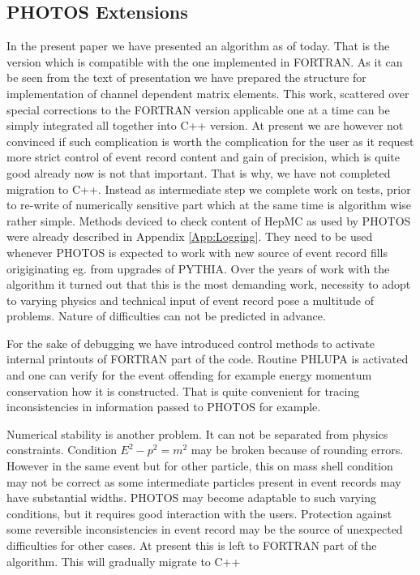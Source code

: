 \documentclass[]{Photos_interface_design}
\begin{document}
\subsection{PHOTOS Extensions}
In the present paper we have presented an algorithm as of today. 
That is the version which is compatible with the one implemented in FORTRAN.
As it can be seen from the text of presentation we have prepared the structure 
for implementation of channel dependent matrix elements. This work, scattered
 over special corrections to the FORTRAN version applicable one at a time can  
be simply integrated all together into C++ version.
 At present we are however not convinced if such complication is worth 
the complication for the user as it request more strict control of event 
record content and gain of precision, which is quite good already now is 
not that important. That is why, we have not completed migration to C++.
Instead as intermediate step we complete work on tests, prior to re-write
 of numerically sensitive part which at the same time is algorithm wise rather 
simple.
Methods deviced to check content of HepMC as used by PHOTOS were already 
described in Appendix \ref{App:Logging}. They need to be used whenever PHOTOS 
is expected to work with new source of event record fills origiginating eg. 
from upgrades of  PYTHIA. 
Over the years of work with the algorithm it turned out that this is the
most demanding work, 
necessity to adopt to varying physics and technical input of event record
pose a multitude of problems. Nature of difficulties can not be predicted 
in advance.


For the sake of debugging we have introduced control methods to activate
 internal printouts of FORTRAN part of the code.
Routine PHLUPA \cite{Barberio:1993qi} is activated and one can verify  
for the event offending for example  energy momentum conservation how it is 
constructed. That is quite convenient for tracing inconsistencies in 
information passed to PHOTOS for example. 


Numerical stability is another  problem. It can not be separated from
 physics constraints. Condition  $E^2-p^2=m^2$ may be broken  because of 
rounding errors. However in the same event but for other particle, this on 
mass shell 
condition may not be correct as some intermediate particles present in event 
records may have substantial widths. 
PHOTOS may become adaptable to such varying conditions, but it requires
good interaction with the users. Protection against some reversible
inconsistencies in event record may be the source of unexpected difficulties
for other cases. At present this is left to FORTRAN part of the algorithm.
This will gradually migrate to C++
\end{document}
